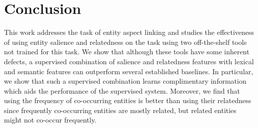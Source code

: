 \section{Conclusion}
\label{sec:Conclusion}
This work addresses the task of entity aspect linking and studies the effectiveness of using entity salience and relatedness on the task using two off-the-shelf tools not trained for this task. We show that although these tools have some inherent defects, a supervised combination of salience and relatedness features with lexical and semantic features can outperform several established baselines. In particular, we show that such a supervised combination learns complimentary information which aids the performance of the supervised system. Moreover, we find that using the frequency of co-occurring entities is better than using their relatedness since frequently co-occurring entities are mostly related, but related entities might not co-occur frequently. 